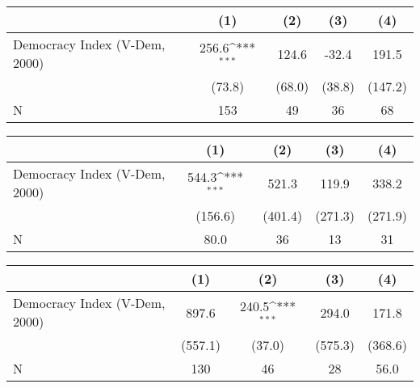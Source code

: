 {
\def\sym#1{\ifmmode^{#1}\else\(^{#1}\)\fi}
\begin{tabular}{l*{4}{c}}
\hline\hline
                    &\multicolumn{1}{c}{(1)}         &\multicolumn{1}{c}{(2)}         &\multicolumn{1}{c}{(3)}         &\multicolumn{1}{c}{(4)}         \\
\hline
Democracy Index (V-Dem, 2000)&       256.6\sym{***}&       124.6         &       -32.4         &       191.5         \\
                    &      (73.8)         &      (68.0)         &      (38.8)         &     (147.2)         \\
\hline
N                   &         153         &          49         &          36         &          68         \\
\hline\hline
\end{tabular}
}
{
\def\sym#1{\ifmmode^{#1}\else\(^{#1}\)\fi}
\begin{tabular}{l*{4}{c}}
\hline\hline
                    &\multicolumn{1}{c}{(1)}         &\multicolumn{1}{c}{(2)}         &\multicolumn{1}{c}{(3)}         &\multicolumn{1}{c}{(4)}         \\
\hline
Democracy Index (V-Dem, 2000)&       544.3\sym{***}&       521.3         &       119.9         &       338.2         \\
                    &     (156.6)         &     (401.4)         &     (271.3)         &     (271.9)         \\
\hline
N                   &        80.0         &          36         &          13         &          31         \\
\hline\hline
\end{tabular}
}
{
\def\sym#1{\ifmmode^{#1}\else\(^{#1}\)\fi}
\begin{tabular}{l*{4}{c}}
\hline\hline
                    &\multicolumn{1}{c}{(1)}         &\multicolumn{1}{c}{(2)}         &\multicolumn{1}{c}{(3)}         &\multicolumn{1}{c}{(4)}         \\
\hline
Democracy Index (V-Dem, 2000)&       897.6         &       240.5\sym{***}&       294.0         &       171.8         \\
                    &     (557.1)         &      (37.0)         &     (575.3)         &     (368.6)         \\
\hline
N                   &         130         &          46         &          28         &        56.0         \\
\hline\hline
\end{tabular}
}
